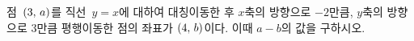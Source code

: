점~$(3,\mkern3mu a)$를 직선~$y=x$에 대하여 대칭이동한 후 $x$축의 방향으로 $-2$만큼, $y$축의 방향으로 $3$만큼 평행이동한 점의 좌표가 $(4,\mkern3mu b)$이다. 이때 $a-b$의 값을 구하시오.
